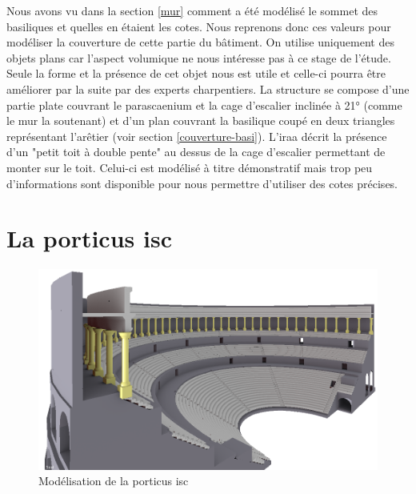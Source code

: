 Nous avons vu dans la section \ref{mur} comment a été modélisé le sommet des basiliques et quelles en étaient les cotes. Nous reprenons donc ces valeurs pour modéliser la couverture de cette partie du bâtiment. On utilise uniquement des objets plans car l'aspect volumique ne nous intéresse pas à ce stage de l'étude. Seule la forme et la présence de cet objet nous est utile et celle-ci pourra être améliorer par la suite par des experts charpentiers. La structure se compose d'une partie plate couvrant le parascaenium et la cage d'escalier inclinée à 21° (comme le mur la soutenant) et d'un plan couvrant la basilique coupé en deux triangles représentant l'arêtier (voir section \ref{couverture-basi}). L'\gls{iraa} décrit la présence d'un "petit toit à double pente" \cite[p. 34]{orangeTxt} au dessus de la cage d'escalier permettant de monter sur le toit. Celui-ci est modélisé à titre démonstratif mais trop peu d'informations sont disponible pour nous permettre d'utiliser des cotes précises.


\section{La \gls{porticus isc}}

\begin{figure}[!h]
	\includegraphics[width=\linewidth]{images/modPorticus}
	\caption{Modélisation de la \gls{porticus isc}} 
	\label{modPorticus} 
\end{figure} 

